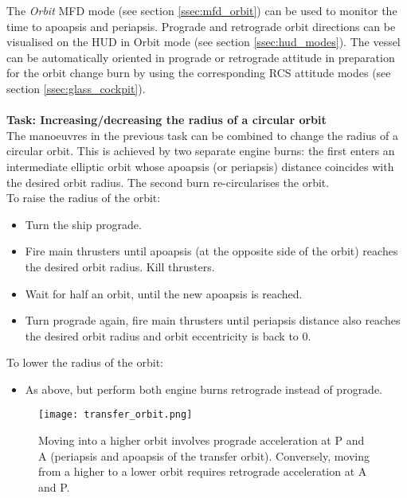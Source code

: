 \documentclass[Orbiter User Manual.tex]{subfiles}
\begin{document}
\noindent
The \textit{Orbit} MFD mode (see section \ref{ssec:mfd_orbit}) can be used to monitor the time to apoapsis and periapsis.  Prograde and retrograde orbit directions can be visualised on the HUD in Orbit mode (see section \ref{ssec:hud_modes}). The vessel can be automatically oriented in prograde or retrograde attitude in preparation for the orbit change burn by using the corresponding RCS attitude modes (see section \ref{ssec:glass_cockpit}).\\
\\
\textbf{Task: Increasing/decreasing the radius of a circular orbit}\\
The manoeuvres in the previous task can be combined to change the radius of a circular orbit. This is achieved by two separate engine burns: the first enters an intermediate elliptic orbit whose apoapsis (or periapsis) distance coincides with the desired orbit radius. The second burn re-circularises the orbit.\\
To raise the radius of the orbit:

\begin{itemize}
\item Turn the ship prograde.
\item Fire main thrusters until apoapsis (at the opposite side of the orbit) reaches the desired orbit radius. Kill thrusters.
\item Wait for half an orbit, until the new apoapsis is reached.
\item Turn prograde again, fire main thrusters until periapsis distance also reaches the desired orbit radius and orbit eccentricity is back to 0.
\end{itemize}

\noindent
To lower the radius of the orbit:

\begin{itemize}
\item As above, but perform both engine burns retrograde instead of prograde.
\end{itemize}

\begin{figure}[H]
	\centering
	\texttt{[image: transfer\_orbit.png]}
	\caption{Moving into a higher orbit involves prograde acceleration at P and A (periapsis and apoapsis of the transfer orbit). Conversely, moving from a higher to a lower orbit requires retrograde acceleration at A and P.}
\end{figure}
\end{document}
